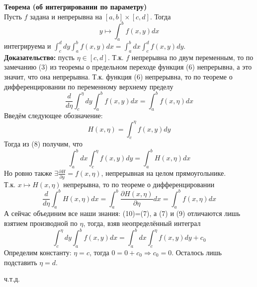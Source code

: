 \documentclass[book, 11pt]{report}
\begin{document}
\par{
\textbf{Теорема (об интегрировании по параметру)}\\
Пусть $f$ задана и непрерывна на $[a,b]\times[c,d]$. Тогда
\begin{equation}
    y\mapsto\int_a^bf(x,y)dx
\end{equation}
интегрируема и $\displaystyle\int_c^ddy\int_a^bf(x,y)dx=\int_a^bdx\int_c^df(x,y)dy$.\\
\textbf{Доказательство: }пусть $\eta\in[c,d]$. Т.к. $f$ непрерывна по двум переменным, то по замечанию (3) из теоремы о предельном переходе функция (6) непрерывна, а это значит, что она непрерывна. Т.к. функция (6) непрерывна, то по теореме о дифференцировании по переменному верхнему пределу 
\begin{equation}
    \frac{d}{d\eta}\int_c^\eta dy\int_a^bf(x,y)dx=\int^b_af(x,\eta)dx
\end{equation}
Введём следующее обозначение:
\begin{equation}
    H(x,\eta)=\int_c^\eta f(x,y)dy
\end{equation}
Тогда из (8) получим, что
\begin{equation}
    \int_a^bdx\int_c^\eta f(x,y)dy=\int_a^bH(x,\eta)dx
\end{equation}
Но ровно также $\exists\frac{\partial H}{\partial y}=f(x,\eta)$, непрерывная на целом прямоугольнике.\\
Т.к. $x\mapsto H(x,\eta)$ непрерывна, то по теореме о дифференцировании 
\begin{equation}
    \frac{d}{d\eta}\int_a^b H(x,\eta)dx=\int_a^b\frac{\partial H(x,\eta)}{\partial\eta}dx=\int_a^bf(x,\eta)dx
\end{equation}
А сейчас объединим все наши знания: (10)=(7), а (7) и (9) отличаются лишь взятием производной по $\eta$, тогда, взяв неопределённый интеграл
\begin{equation}
    \int_c^\eta dy\int_a^bf(x,y)dx=\int_a^bdx\int_c^\eta f(x,y)dy+c_0
\end{equation}
Определим константу: $\eta=c$, тогда $0=0+c_0\Rightarrow c_0=0$. Осталось лишь подставить $\eta = d$.
}
\par{{\raggedleft ч.т.д.\par}}
    \vspace{1.5cm}
\setcounter{equation}{0}
\end{document}
